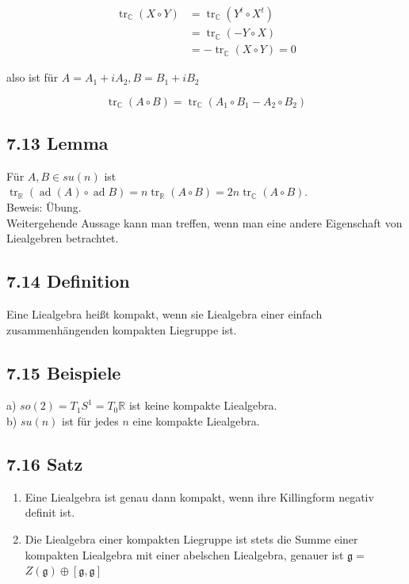 \documentclass[10pt, letterpaper]{article}
\begin{document}
$$
\begin{aligned}
\operatorname{tr}_{\mathbb{C}}(X \circ Y) & =\operatorname{tr}_{\mathbb{C}}\left(Y^{t} \circ X^{t}\right) \\
& =\operatorname{tr}_{\mathbb{C}}(-Y \circ X) \\
& =-\operatorname{tr}_{\mathbb{C}}(X \circ Y)=0
\end{aligned}
$$

also ist für $A=A_{1}+i A_{2}, B=B_{1}+i B_{2}$

$$
\operatorname{tr}_{\mathbb{C}}(A \circ B)=\operatorname{tr}_{\mathbb{C}}\left(A_{1} \circ B_{1}-A_{2} \circ B_{2}\right)
$$

\subsection*{7.13 Lemma}
Für $A, B \in s u(n)$ ist $\operatorname{tr}_{\mathbb{R}}(\operatorname{ad}(A) \circ \operatorname{ad} B)=n \operatorname{tr}_{\mathbb{R}}(A \circ B)=2 n \operatorname{tr}_{\mathbb{C}}(A \circ B)$.\\
Beweis: Übung.\\
Weitergehende Aussage kann man treffen, wenn man eine andere Eigenschaft von Liealgebren betrachtet.

\subsection*{7.14 Definition}
Eine Liealgebra heißt kompakt, wenn sie Liealgebra einer einfach zusammenhängenden kompakten Liegruppe ist.

\subsection*{7.15 Beispiele}
a) $s o(2)=T_{1} S^{1}=T_{0} \mathbb{R}$ ist keine kompakte Liealgebra.\\
b) $s u(n)$ ist für jedes $n$ eine kompakte Liealgebra.

\subsection*{7.16 Satz}
\begin{enumerate}
  \item Eine Liealgebra ist genau dann kompakt, wenn ihre Killingform negativ definit ist.
  \item Die Liealgebra einer kompakten Liegruppe ist stets die Summe einer kompakten Liealgebra mit einer abelschen Liealgebra, genauer ist $\mathfrak{g}=$ $Z(\mathfrak{g}) \oplus[\mathfrak{g}, \mathfrak{g}]$
\end{enumerate}
\end{document}
